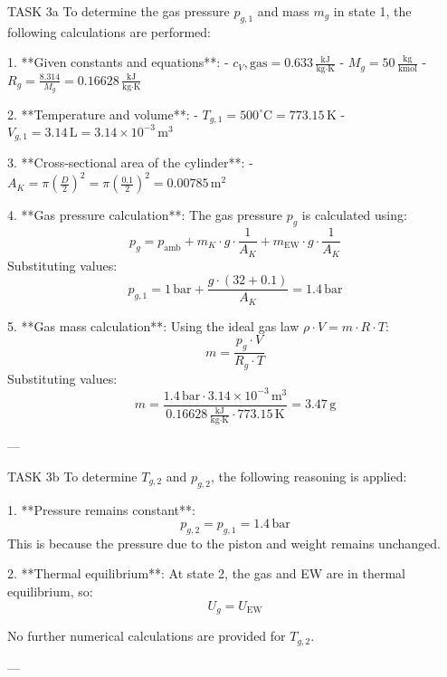 TASK 3a  
To determine the gas pressure \( p_{g,1} \) and mass \( m_g \) in state 1, the following calculations are performed:

1. **Given constants and equations**:  
   - \( c_V, \text{gas} = 0.633 \, \frac{\text{kJ}}{\text{kg·K}} \)  
   - \( M_g = 50 \, \frac{\text{kg}}{\text{kmol}} \)  
   - \( R_g = \frac{8.314}{M_g} = 0.16628 \, \frac{\text{kJ}}{\text{kg·K}} \)  

2. **Temperature and volume**:  
   - \( T_{g,1} = 500^\circ\text{C} = 773.15 \, \text{K} \)  
   - \( V_{g,1} = 3.14 \, \text{L} = 3.14 \times 10^{-3} \, \text{m}^3 \)  

3. **Cross-sectional area of the cylinder**:  
   - \( A_K = \pi \left(\frac{D}{2}\right)^2 = \pi \left(\frac{0.1}{2}\right)^2 = 0.00785 \, \text{m}^2 \)  

4. **Gas pressure calculation**:  
   The gas pressure \( p_g \) is calculated using:  
   \[
   p_g = p_{\text{amb}} + m_K \cdot g \cdot \frac{1}{A_K} + m_{\text{EW}} \cdot g \cdot \frac{1}{A_K}
   \]  
   Substituting values:  
   \[
   p_{g,1} = 1 \, \text{bar} + \frac{g \cdot (32 + 0.1)}{A_K} = 1.4 \, \text{bar}
   \]  

5. **Gas mass calculation**:  
   Using the ideal gas law \( \rho \cdot V = m \cdot R \cdot T \):  
   \[
   m = \frac{p_g \cdot V}{R_g \cdot T}
   \]  
   Substituting values:  
   \[
   m = \frac{1.4 \, \text{bar} \cdot 3.14 \times 10^{-3} \, \text{m}^3}{0.16628 \, \frac{\text{kJ}}{\text{kg·K}} \cdot 773.15 \, \text{K}} = 3.47 \, \text{g}
   \]  

---

TASK 3b  
To determine \( T_{g,2} \) and \( p_{g,2} \), the following reasoning is applied:

1. **Pressure remains constant**:  
   \[
   p_{g,2} = p_{g,1} = 1.4 \, \text{bar}
   \]  
   This is because the pressure due to the piston and weight remains unchanged.

2. **Thermal equilibrium**:  
   At state 2, the gas and EW are in thermal equilibrium, so:  
   \[
   U_g = U_{\text{EW}}
   \]  

No further numerical calculations are provided for \( T_{g,2} \).  

---